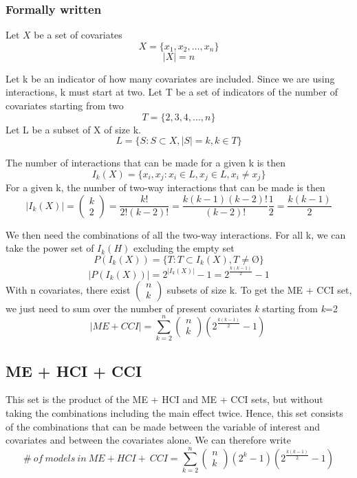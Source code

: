 \subsubsection{Formally written}
Let $X$ be a set of covariates 
\[X=\{\left.x_1,x_2,\dots ,x_n\right.\}\] 
\[|X|=n\] 

Let k be an indicator of how many covariates are included. Since we are using interactions, k must start at two. Let T be a set of indicators of the number of covariates starting from two
\[T=\{\left.2,3,4,\dots ,n\right.\}\] 
Let L be a subset of X of size k.
\[L=\{\left.S:S\subset X,\left|S\right|=k,k\in T\right.\}\] 

\noindent The number of interactions that can be made for a given k is then
\[I_k\left(X\right)=\{\left.\left.x_i,x_j\right.:x_i\in L,x_j\in L,x_i\neq x_j\right.\}\] 
For a given k, the number of two-way interactions that can be made is then
\[\left|I_k\left(X\right)\right|=\left( \begin{array}{c}
k \\ 
2 \end{array}
\right)=\frac{k!}{2!\left(k-2\right)!}=\frac{k\left(k-1\right)\left(k-2\right)!}{\left(k-2\right)!}\frac{1}{2}=\frac{k\left(k-1\right)}{2}\] 

We then need the combinations of all the two-way interactions. For all k, we can take the power set of $I_k\left(H\right)$ excluding the empty set
\[P\left(I_k\left(X\right)\right)=\{\left.T:T\subset I_k\left(X\right),T\neq \textrm{\O}\right.\}\] 
\[\left|P\left(I_k\left(X\right)\right)\right|=2^{\left|I_k\left(X\right)\right|}-1=2^{\frac{k\left(k-1\right)}{2}}-1\] 
With n covariates, there exist $\left( \begin{array}{c}
n \\ 
k \end{array}
\right)$ subsets of size k. To get the ME + CCI set, we just need to sum over the number of present covariates \textit{k} starting from \textit{k}=2
\[\left|ME+CCI\right|=\sum^n_{k=2}{\left( \begin{array}{c}
n \\ 
k \end{array}
\right)}\left(2^{\frac{k\left(k-1\right)}{2}}-1\right)\ \] 

\subsection{ME + HCI + CCI}
This set is the product of the ME + HCI and ME + CCI sets, but without taking the combinations including the main effect twice. Hence, this set consists of the combinations that can be made between the variable of interest and covariates and between the covariates alone. We can therefore write 
\[\#\ of\ models\ in\ ME+HCI+\ CCI=\sum^n_{k=2}{\left( \begin{array}{c}
n \\ 
k \end{array}
\right)\left(2^k-1\right)\left(2^{\frac{k\left(k-1\right)}{2}}-1\right)}\] 
